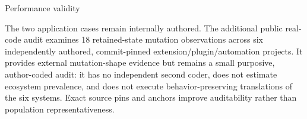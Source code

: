 
\makeatletter

\newcommand{\PatchRoundSixAbstract}{%
\par\smallskip
An exploratory public-source audit adds 18 retained-state mutation observations from six commit-pinned extension, plugin, and automation projects. Five observations are direct local fits to the current Patch surface, eleven require representation/host/dynamic-target adapters, and two require source restructuring; three have the same narrow singleton numeric directional shape as the current Lean bridge. Because sampling is purposive, these counts are descriptive of the audited corpus and are not prevalence estimates.%
}

\long{}{%
The two application cases remain internally authored. The additional public real-code audit examines 18 retained-state mutation observations across six independently authored, commit-pinned extension/plugin/automation projects. It provides external mutation-shape evidence but remains a small purposive, author-coded audit: it has no independent second coder, does not estimate ecosystem prevalence, and does not execute behavior-preserving translations of the six systems. Exact source pins and anchors improve auditability rather than population representativeness.

%
}

